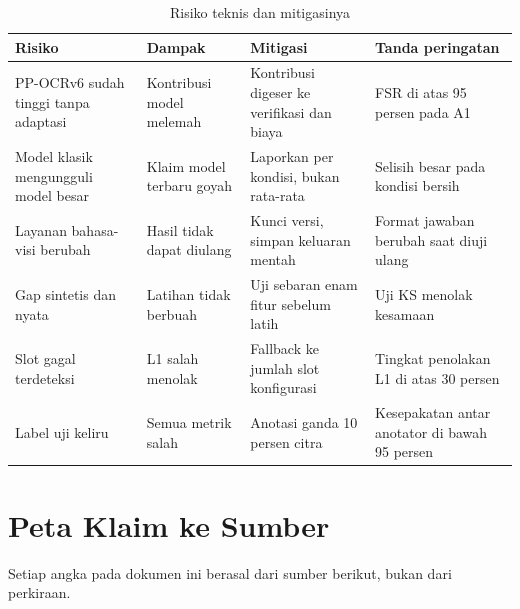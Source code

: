 \documentclass[12pt,a4paper,oneside]{report}
\begin{document}
\begin{table}[H]
\caption{Risiko teknis dan mitigasinya}
\label{tab:risiko}
\begin{tabularx}{\textwidth}{@{}L{3.4cm} L{3.6cm} L{4.6cm} X@{}}
\toprule
\textbf{Risiko} & \textbf{Dampak} & \textbf{Mitigasi} & \textbf{Tanda peringatan} \\
\midrule
PP-OCRv6 sudah tinggi tanpa adaptasi & Kontribusi model melemah & Kontribusi digeser ke verifikasi dan biaya & FSR di atas 95 persen pada A1 \\
Model klasik mengungguli model besar & Klaim model terbaru goyah & Laporkan per kondisi, bukan rata-rata & Selisih besar pada kondisi bersih \\
Layanan bahasa-visi berubah & Hasil tidak dapat diulang & Kunci versi, simpan keluaran mentah & Format jawaban berubah saat diuji ulang \\
Gap sintetis dan nyata & Latihan tidak berbuah & Uji sebaran enam fitur sebelum latih & Uji KS menolak kesamaan \\
Slot gagal terdeteksi & L1 salah menolak & Fallback ke jumlah slot konfigurasi & Tingkat penolakan L1 di atas 30 persen \\
Label uji keliru & Semua metrik salah & Anotasi ganda 10 persen citra & Kesepakatan antar anotator di bawah 95 persen \\
\bottomrule
\end{tabularx}
\end{table}

\chapter{Peta Klaim ke Sumber}

Setiap angka pada dokumen ini berasal dari sumber berikut, bukan dari perkiraan.
\end{document}
